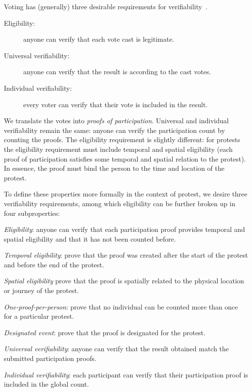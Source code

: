 Voting has (generally) three desirable requirements for verifiability~\cite{VerifyingPrivacyPropertiesOfVotingProtocols}.
\begin{description}
  \item[Eligibility:] anyone can verify that each vote cast is legitimate.
  \item[Universal verifiability:] anyone can verify that the result is according 
    to the cast votes.
  \item[Individual verifiability:] every voter can verify that their vote is 
    included in the result.
\end{description}
We translate the votes into \emph{proofs of participation}.
Universal and individual verifiability remain the same: anyone can verify the participation count by counting the proofs.
The eligibility requirement is slightly different: for protests the eligibility requirement must include temporal and spatial 
eligibility (\ie each proof of participation satisfies some temporal and spatial relation to the protest).
In essence, the proof must bind the person to the time and location of the protest.

To define these properties more formally in the context of protest, we desire three verifiability requirements, among which eligibility can be further broken up in four subproperties:
\begin{requirements}[V]
  \item\label{EligibilityVerif} \emph{Eligibility}: anyone can verify that each participation proof provides temporal and spatial eligibility and that it has not been counted before.
    \begin{requirements}
    \item \emph{Temporal eligibility}:%
      \label{CreatedAfterStart} prove that the proof was created after the start of the protest and
      before the end of the protest.
    \item \emph{Spatial eligibility}
      \label{SpatiallyRelated} prove that the proof is spatially related to the physical location or journey of the protest.
    \item \emph{One-proof-per-person}:%
      \label{CountOnce} prove that no individual can be counted more than once for a particular protest.
    \item \emph{Designated event}:%
      \label{DesignatedEvent} prove that the proof is designated for the protest.
    \end{requirements}

  \item\label{UniversalVerif} \emph{Universal verifiability}: anyone can verify that the result obtained match the submitted participation proofs.
  \item\label{IndividualVerif} \emph{Individual verifiability}: each participant can verify that their participation proof is included in the global count.
\end{requirements}

